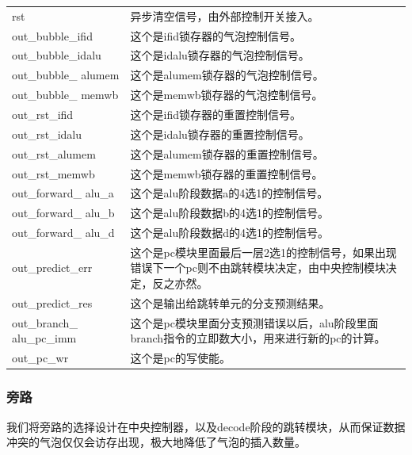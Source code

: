 \begin{center}
\begin{longtable}{p{}p{}}
            rst & 异步清空信号，由外部控制开关接入。\\
            out\_bubble\_ifid & 这个是ifid锁存器的气泡控制信号。\\
            out\_bubble\_idalu & 这个是idalu锁存器的气泡控制信号。\\
            out\_bubble\_  alumem & 这个是alumem锁存器的气泡控制信号。\\
            out\_bubble\_  memwb & 这个是memwb锁存器的气泡控制信号。\\
            out\_rst\_ifid & 这个是ifid锁存器的重置控制信号。\\
            out\_rst\_idalu & 这个是idalu锁存器的重置控制信号。\\
            out\_rst\_alumem & 这个是alumem锁存器的重置控制信号。\\
            out\_rst\_memwb & 这个是memwb锁存器的重置控制信号。\\
            out\_forward\_  alu\_a & 这个是alu阶段数据a的4选1的控制信号。\\
            out\_forward\_  alu\_b & 这个是alu阶段数据b的4选1的控制信号。\\
            out\_forward\_  alu\_d & 这个是alu阶段数据d的4选1的控制信号。\\
            out\_predict\_err & 这个是pc模块里面最后一层2选1的控制信号，如果出现错误下一个pc则不由跳转模块决定，由中央控制模块决定，反之亦然。\\
            out\_predict\_res & 这个是输出给跳转单元的分支预测结果。\\
            out\_branch\_  alu\_pc\_imm & 这个是pc模块里面分支预测错误以后，alu阶段里面branch指令的立即数大小，用来进行新的pc的计算。\\
            out\_pc\_wr & 这个是pc的写使能。\\
        \bottomrule
    \end{longtable}
\end{center}

\subsubsection{旁路}
我们将旁路的选择设计在中央控制器，以及decode阶段的跳转模块，从而保证数据冲突的气泡仅仅会访存出现，极大地降低了气泡的插入数量。

